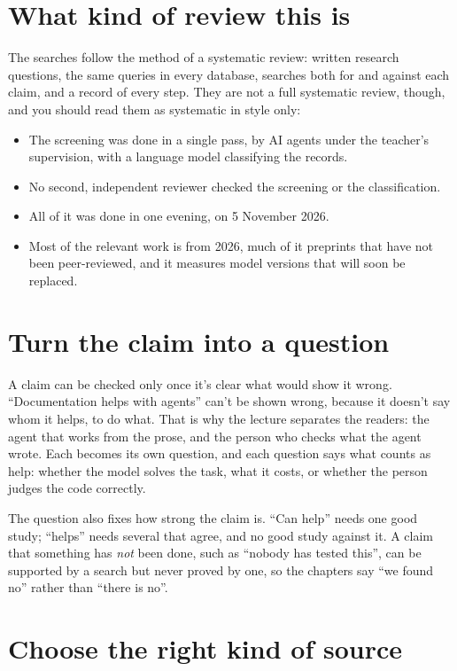 \section{What kind of review this is}

The searches follow the method of a systematic review: written research
questions, the same queries in every database, searches both for and against
each claim, and a record of every step.
They are not a full systematic review, though, and you should read them as
systematic in style only:
\begin{itemize}
  \item The screening was done in a single pass, by AI agents under the
    teacher's supervision, with a language model classifying the records.
  \item No second, independent reviewer checked the screening or the
    classification.
  \item All of it was done in one evening, on 5 November 2026.
  \item Most of the relevant work is from 2026, much of it preprints that have
    not been peer-reviewed, and it measures model versions that will soon be
    replaced.
\end{itemize}

\section{Turn the claim into a question}

A claim can be checked only once it's clear what would show it wrong.
\enquote{Documentation helps with agents} can't be shown wrong, because it
doesn't say whom it helps, to do what.
That is why the lecture separates the readers: the agent that works from the
prose, and the person who checks what the agent wrote.
Each becomes its own question, and each question says what counts as help:
whether the model solves the task, what it costs, or whether the person judges
the code correctly.

The question also fixes how strong the claim is.
\enquote{Can help} needs one good study; \enquote{helps} needs several that
agree, and no good study against it.
A claim that something has \emph{not} been done, such as \enquote{nobody has
tested this}, can be supported by a search but never proved by one, so the
chapters say \enquote{we found no} rather than \enquote{there is no}.

\section{Choose the right kind of source}


